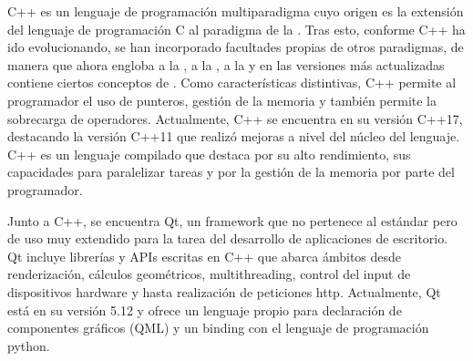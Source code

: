 C++\cite{cpp}\cite{cpp2} es un lenguaje de programación multiparadigma cuyo origen es la extensión del lenguaje de programación C al paradigma de la . Tras esto, conforme C++ ha ido evolucionando, se han incorporado facultades propias de otros paradigmas, de manera que ahora engloba a la , a la , a la  y en las versiones más actualizadas contiene ciertos conceptos de .
Como características distintivas, C++ permite al programador el uso de punteros, gestión de la memoria y también permite la sobrecarga de operadores.
Actualmente, C++ se encuentra en su versión C++17, destacando la versión C++11 que realizó mejoras a nivel del núcleo del lenguaje.
C++ es un lenguaje compilado que destaca por su alto rendimiento, sus capacidades para paralelizar tareas y por la gestión de la memoria por parte del programador.

Junto a C++, se encuentra Qt\cite{qtDoc}\cite{qt1}\cite{qt2}, un framework que no pertenece al estándar pero de uso muy extendido para la tarea del desarrollo de aplicaciones de escritorio.
Qt incluye librerías y APIs escritas en C++ que abarca ámbitos desde renderización, cálculos geométricos, multithreading, control del input de dispositivos hardware y hasta realización de peticiones http.
Actualmente, Qt está en su versión 5.12 y ofrece un lenguaje propio para declaración de componentes gráficos (QML\cite{qml}) y un binding con el lenguaje de programación python.